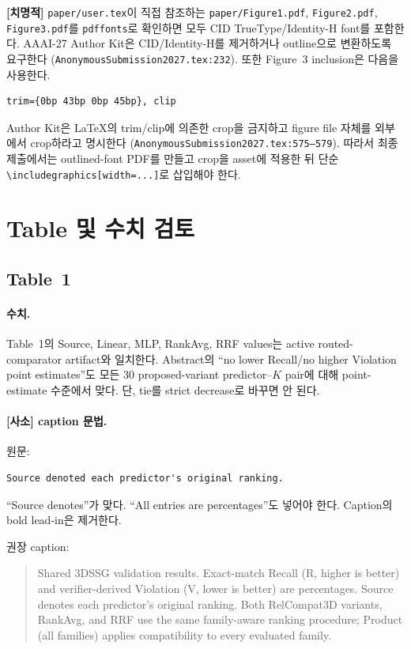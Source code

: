 \documentclass[11pt]{article}
\newcommand{\fatal}{\textbf{\textcolor{fatalred}{[치명적]}}}
\newcommand{\minor}{\textbf{\textcolor{minorblue}{[사소]}}}
\newcommand{\fileline}[1]{\texttt{#1}}
\begin{document}
\fatal{} \fileline{paper/user.tex}이 직접 참조하는
\fileline{paper/Figure1.pdf}, \fileline{Figure2.pdf}, \fileline{Figure3.pdf}를
\texttt{pdffonts}로 확인하면 모두 CID TrueType/Identity-H font를 포함한다. AAAI-27
Author Kit은 CID/Identity-H를 제거하거나 outline으로 변환하도록 요구한다
(\fileline{AnonymousSubmission2027.tex:232}). 또한 Figure~3 inclusion은 다음을
사용한다.

\begin{verbatim}
trim={0bp 43bp 0bp 45bp}, clip
\end{verbatim}

Author Kit은 LaTeX의 trim/clip에 의존한 crop을 금지하고 figure file 자체를 외부에서
crop하라고 명시한다
(\fileline{AnonymousSubmission2027.tex:575--579}). 따라서 최종 제출에서는
outlined-font PDF를 만들고 crop을 asset에 적용한 뒤 단순
\texttt{\textbackslash includegraphics[width=...]}로 삽입해야 한다.

\section{Table 및 수치 검토}

\subsection{Table~1}

\paragraph{수치.}

Table~1의 Source, Linear, MLP, RankAvg, RRF values는 active routed-comparator
artifact와 일치한다. Abstract의 ``no lower Recall/no higher Violation point
estimates''도 모든 30 proposed-variant predictor--$K$ pair에 대해 point-estimate
수준에서 맞다. 단, tie를 strict decrease로 바꾸면 안 된다.

\paragraph{\minor{} caption 문법.}

원문:
\begin{verbatim}
Source denoted each predictor's original ranking.
\end{verbatim}

``Source denotes''가 맞다. ``All entries are percentages''도 넣어야 한다. Caption의
bold lead-in은 제거한다.

권장 caption:
\begin{quote}
Shared 3DSSG validation results. Exact-match Recall (R, higher is better) and
verifier-derived Violation (V, lower is better) are percentages. Source denotes
each predictor's original ranking. Both RelCompat3D variants, RankAvg, and RRF
use the same family-aware ranking procedure; Product (all families) applies
compatibility to every evaluated family.
\end{quote}
\end{document}
